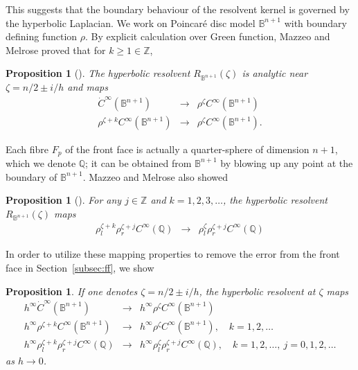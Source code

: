 \documentclass[10pt, a4paper, twoside]{amsart}
\numberwithin{equation}{section}
\newtheorem{proposition}[theorem]{Proposition}
\theoremstyle{remark}
\begin{document}
This suggests that  the boundary behaviour of the resolvent kernel is governed by the hyperbolic Laplacian. We work on Poincar\'{e} disc model $\mathbb{B}^{n + 1}$ with boundary defining function $\rho$. By explicit calculation over Green function, Mazzeo and Melrose proved that for $k \geq 1 \in {\mathbb{Z}}$, 
\begin{proposition}[\cite{Mazzeo-Melrose}] The hyperbolic resolvent $R_{\mathbb{B}^{n+1}}(\zeta)$  is analytic near $\zeta = n/2 \pm i/h$ and maps \begin{eqnarray*}\dot{C}^\infty(\mathbb{B}^{n + 1}) &\longrightarrow& \rho^\zeta C^\infty(\mathbb{B}^{n + 1})\\ \rho^{\zeta + k} C^\infty(\mathbb{B}^{n + 1}) &\longrightarrow& \rho^\zeta C^\infty(\mathbb{B}^{n + 1}). \end{eqnarray*}\end{proposition}

Each fibre $F_p$ of the front face is actually a quarter-sphere of dimension $n+1$, which we denote $\mathbb{Q}$; it can be obtained from $\mathbb{B}^{n + 1}$ by blowing up any point at the boundary of $\mathbb{B}^{n + 1}$.  Mazzeo and Melrose also showed 
\begin{proposition}[\cite{Mazzeo-Melrose}] For any $j \in {\mathbb{Z}}$ and $k = 1, 2, 3, \dots$, the hyperbolic resolvent $R_{\mathbb{B}^{n+1}}(\zeta)$ maps 
 \begin{eqnarray*}\rho_l^{\zeta + k} \rho_r^{\zeta + j} C^\infty(\mathbb{Q}) & \longrightarrow & \rho_l^{\zeta} \rho_r^{\zeta+j} C^\infty(\mathbb{Q})\end{eqnarray*} \end{proposition}

In order to utilize these mapping properties to remove the error from the front face in Section~\ref{subsec:ff},  we show 

\begin{proposition}\label{normal operator}If one denotes $\zeta = n/2 \pm i/h$, the hyperbolic resolvent at $\zeta$ maps 
\begin{eqnarray*}
h^\infty \dot{C}^\infty(\mathbb{B}^{n + 1}) &\longrightarrow& h^\infty \rho^\zeta C^\infty(\mathbb{B}^{n + 1})\\ 
h^\infty \rho^{\zeta + k} C^\infty(\mathbb{B}^{n + 1}) &\longrightarrow& h^\infty\rho^\zeta C^\infty(\mathbb{B}^{n + 1}), \quad k = 1, 2, \dots  \\ h^\infty \rho_l^{\zeta + k} \rho_r^{\zeta + j} C^\infty(\mathbb{Q}) & \longrightarrow & h^\infty\rho_l^{\zeta} \rho_r^{\zeta+j} C^\infty(\mathbb{Q}), \quad k = 1, 2, \dots, \ j = 0, 1, 2, \dots
\end{eqnarray*} as $h \rightarrow 0$.
\end{proposition}
\end{document}
